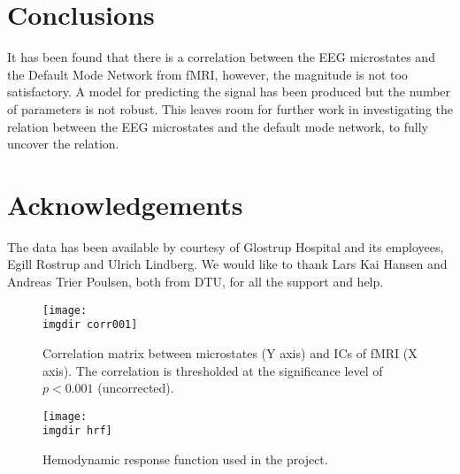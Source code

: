 \documentclass{article}
\newcommand{\imgdir}{Images/} %
\begin{document}

\section{Conclusions}
It has been found that there is a correlation between the EEG microstates and the Default Mode Network from fMRI, however, the magnitude is not too satisfactory. A model for predicting the signal has been produced but the number of parameters is not robust. This leaves room for further work in investigating the relation between the EEG microstates and the default mode network, to fully uncover the relation.

\section{Acknowledgements}
The data has been available by courtesy of Glostrup Hospital and its employees, Egill Rostrup and Ulrich Lindberg. We would like to thank Lars Kai Hansen and
Andreas Trier Poulsen, both from DTU, for all the support and help.



\begin{figure}[!ht]
    \centering
    \texttt{[image: \\imgdir corr001]}
    \caption{Correlation matrix between microstates (Y axis) and ICs of fMRI (X axis). The correlation is thresholded at the significance level of $p<0.001$ (uncorrected).}
    \label{fig:grid}
\end{figure}

\begin{figure}[!ht]
    \centering
    \texttt{[image: \\imgdir hrf]}
    \caption{Hemodynamic response function used in the project.}
    \label{fig:hrf}
\end{figure}
\end{document}
